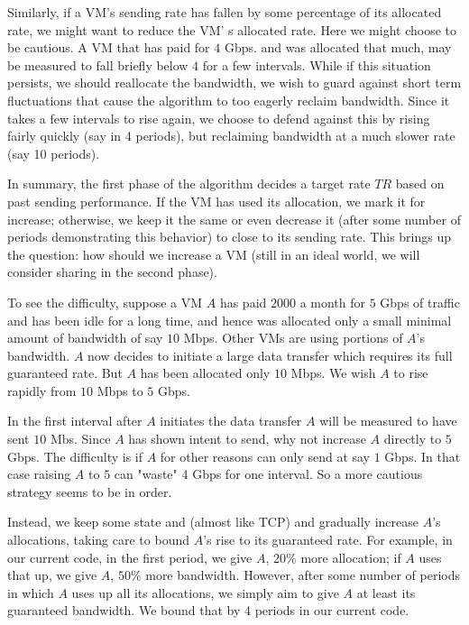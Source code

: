 Similarly, if a VM's sending rate has fallen by some percentage of its allocated
rate, we might want to reduce the VM' s allocated rate.  Here we might choose to
be cautious.  A VM that has paid for $4$ Gbps. and was allocated that much, may
be measured to fall briefly below $4$ for a few intervals.  While if this
situation persists, we should reallocate the bandwidth, we wish to guard against
short term fluctuations that cause the algorithm to too eagerly reclaim
bandwidth.  Since it takes a few intervals to rise again, we choose to defend
against this by rising fairly quickly (say in 4 periods), but reclaiming
bandwidth at a much slower rate (say 10 periods).   

In summary, the first phase of the algorithm decides a target rate $TR$ based on
past sending performance.  If the VM has used its allocation, we mark it for
increase; otherwise, we keep it the same or even decrease it (after some number
of periods demonstrating this behavior) to close to its sending rate.    This
brings up the question: how should we increase a VM (still in an ideal world, we
will consider sharing in the second phase).  

To see the difficulty, suppose a VM $A$ has paid $2000$ a month for $5$ Gbps of
traffic and has been idle for a long time, and hence was allocated only a small
minimal amount of bandwidth of say $10$ Mbps.  Other VMs are using portions of
$A$'s bandwidth.  $A$ now decides to initiate a large data transfer which
requires its full guaranteed rate.   But $A$ has been allocated only $10$ Mbps.
We wish $A$ to rise rapidly from $10$ Mbps to $5$ Gbps.

In the first interval after $A$ initiates the data transfer $A$ will be measured
to have sent $10$ Mbs.  Since $A$ has shown intent to send, why not increase $A$
directly to $5$ Gbps.   The difficulty is if $A$ for other reasons can only send
at say $1$ Gbps.  In that case raising $A$ to $5$ can "waste" 4 Gbps for one
interval.  So a more cautious strategy seems to be in order.

Instead, we keep some state and (almost like TCP) and gradually increase $A$'s
allocations, taking care to bound $A$'s rise to its guaranteed rate.   For
example, in our current code, in the first period, we give $A$, $20\%$ more
allocation; if $A$ uses that up, we give $A$, $50\%$ more bandwidth.  However,
after some number of periods in which $A$ uses up all its allocations, we simply
aim to give $A$ at least its guaranteed bandwidth.   We bound that by 4 periods
in our current code.    

